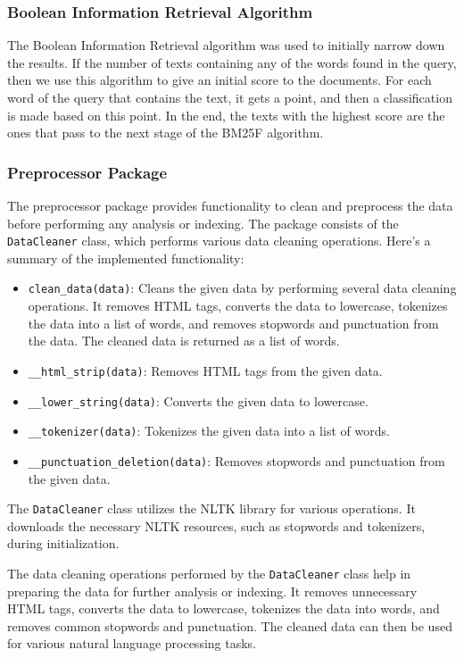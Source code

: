 \documentclass{article}
\begin{document}
\subsubsection{Boolean Information Retrieval Algorithm}
The Boolean Information Retrieval algorithm was used to initially narrow down the results. 
If the number of texts containing any of the words found in the query, then we use this 
algorithm to give an initial score to the documents. For each word of the query that contains 
the text, it gets a point, and then a classification is made based on this point. In the end, 
the texts with the highest score are the ones that pass to the next stage of the BM25F algorithm.

\subsubsection{Preprocessor Package}

The preprocessor package provides functionality to clean and preprocess the data before 
performing any analysis or indexing. The package consists of the \texttt{DataCleaner} class, 
which performs various data cleaning operations. Here's a summary of the implemented 
functionality:

\begin{itemize}
    \item \texttt{clean\_data(data)}: Cleans the given data by performing several data cleaning 
    operations. It removes HTML tags, converts the data to lowercase, tokenizes the data into a 
    list of words, and removes stopwords and punctuation from the data. The cleaned data is 
    returned as a list of words.
    \item \texttt{\_\_html\_strip(data)}: Removes HTML tags from the given data.
    \item \texttt{\_\_lower\_string(data)}: Converts the given data to lowercase.
    \item \texttt{\_\_tokenizer(data)}: Tokenizes the given data into a list of words.
    \item \texttt{\_\_punctuation\_deletion(data)}: Removes stopwords and punctuation from the 
    given data.
\end{itemize}

The \texttt{DataCleaner} class utilizes the NLTK library for various operations. It downloads 
the necessary NLTK resources, such as stopwords and tokenizers, during initialization.

The data cleaning operations performed by the \texttt{DataCleaner} class help in preparing the 
data for further analysis or indexing. It removes unnecessary HTML tags, converts the data to 
lowercase, tokenizes the data into words, and removes common stopwords and punctuation. The 
cleaned data can then be used for various natural language processing tasks.
\end{document}
